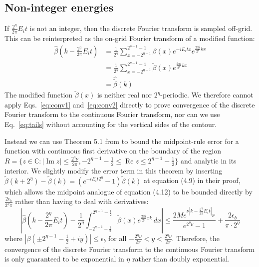\documentclass[aps,floatfix,10pt,amssymb,amsfont,amsmath,superscriptaddress,float,nofootinbib,longbibliography,nobalancelastpage,twocolumn]{revtex4-2}
\begin{document}
\subsection{Non-integer energies}
If $\frac{2^{\eta}}{2\pi}E_it$ is not an integer, then the discrete Fourier transform is sampled off-grid. This can be reinterpreted as the on-grid Fourier transform of a modified function:
\begin{align}
    \hat \beta(k -\frac{2^{\eta}}{2\pi}E_it) &= \frac{1}{2^{\eta}} \sum_{x=-2^{\eta-1}}^{2^{\eta-1}-1} \beta(x) e^{-iE_it x}e^{\frac{2\pi i}{2^{\eta}} kx}\\
    &= \frac{1}{2^{\eta}} \sum_{x=-2^{\eta-1}}^{2^{\eta-1}-1} \tilde\beta(x)e^{\frac{2\pi i}{2^{\eta}} kx}\\
    &= \hat{\tilde\beta}(k)
\end{align}
The modified function $\tilde\beta(x)$ is neither real nor $2^{\eta}$-periodic. We therefore cannot apply Eqs.~\eqref{eq:conv1} and~\eqref{eq:conv2} directly to prove convergence of the discrete Fourier transform to the continuous Fourier transform, nor can we use Eq.~\eqref{eq:tails} without accounting for the vertical sides of the contour.

Instead we can use Theorem 5.1 from \cite{javed2014trapezoidal} to bound the midpoint-rule error for a function with continuous first derivative on the boundary of the region $R = \{z \in \mathbb{C}: |\operatorname{Im} z| \leq  \frac{2^{\eta}\nu}{2\pi}, -2^{\eta-1}-\frac{1}{2}\leq\operatorname{Re} z \leq 2^{\eta-1}-\frac{1}{2}\}$ and analytic in its interior. We slightly modify the error term in this theorem by inserting $\tilde \beta(k+2^{\eta})- \tilde \beta(k)= (e^{-iE_i t2^{\eta}}-1)\tilde \beta(k)$ at equation (4.9) in their proof, which allows the midpoint analogue of equation (4.12) to be bounded directly by $\frac{2\epsilon_b}{2^{\eta}\pi}$ rather than having to deal with derivatives:
\begin{equation}
    \left| \hat \beta\!\left(k-\frac{2^{\eta}}{2\pi}E_it\right) - \frac{1}{2^{\eta}} \int_{-2^{\eta-1}-\frac{1}{2}}^{2^{\eta-1}-\frac{1}{2}}\tilde\beta(x)e^{\frac{2\pi i}{2^{\eta}}xk}\,dx \right| \leq \frac{2 Me^{\nu|k-\frac{2^{\eta}}{2\pi}E_i t|_{2^{\eta}}}}{e^{2^{\eta}\nu}-1} + \frac{2\epsilon_{b}}{\pi\cdot 2^{\eta}}
\end{equation}
where $|\beta(\pm2^{\eta-1}-\frac{1}{2}+iy)| \leq \epsilon_{b}$ for all $-\frac{2^{\eta}\nu}{2\pi}<y<\frac{2^{\eta}\nu}{2\pi}$. Therefore, the convergence of the discrete Fourier transform to the continuous Fourier transform is only guaranteed to be exponential in $\eta$ rather than doubly exponential.
\end{document}
